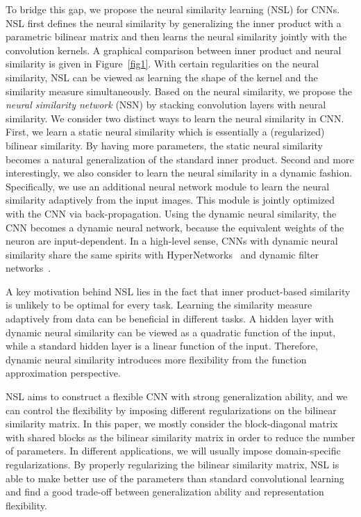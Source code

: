 \par To bridge this gap, we propose the neural similarity learning (NSL) for CNNs. NSL first defines the neural similarity by generalizing the inner product with a parametric bilinear matrix and then learns the neural similarity jointly with the convolution kernels. A graphical comparison between inner product and neural similarity is given in Figure~\ref{fig1}. With certain regularities on the neural similarity, NSL can be viewed as learning the shape of the kernel and the similarity measure simultaneously. Based on the neural similarity, we propose the \emph{neural similarity network} (NSN) by stacking convolution layers with neural similarity. We consider two distinct ways to learn the neural similarity in CNN. First, we learn a static neural similarity which is essentially a (regularized) bilinear similarity. By having more parameters, the static neural similarity becomes a natural generalization of the standard inner product. Second and more interestingly, we also consider to learn the neural similarity in a dynamic fashion. Specifically, we use an additional neural network module to learn the neural similarity adaptively from the input images. This module is jointly optimized with the CNN via back-propagation. Using the dynamic neural similarity, the CNN becomes a dynamic neural network, because the equivalent weights of the neuron are input-dependent. In a high-level sense, CNNs with dynamic neural similarity share the same spirits with HyperNetworks~\cite{ha2016hypernetworks} and dynamic filter networks~\cite{jia2016dynamic}. 
\par

A key motivation behind NSL lies in the fact that inner product-based similarity is unlikely to be optimal for every task. Learning the similarity measure adaptively from data can be beneficial in different tasks. A hidden layer with dynamic neural similarity can be viewed as a quadratic function of the input, while a standard hidden layer is a linear function of the input. Therefore, dynamic neural similarity introduces more flexibility from the function approximation perspective.

\par
NSL aims to construct a flexible CNN with strong generalization ability, and we can control the flexibility by imposing different regularizations on the bilinear similarity matrix. In this paper, we mostly consider the block-diagonal matrix with shared blocks as the bilinear similarity matrix in order to reduce the number of parameters. In different applications, we will usually impose domain-specific regularizations. By properly regularizing the bilinear similarity matrix, NSL is able to make better use of the parameters than standard convolutional learning and find a good trade-off between generalization ability and representation flexibility. 

